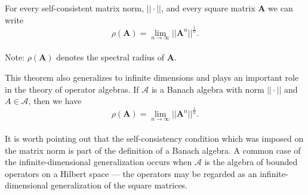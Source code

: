 \documentclass[12pt]{article}
\newcommand{\mv}[1]{\mathbf{#1}}
\begin{document}
For every self-consistent matrix norm, $||\cdot||$, and every square matrix $\mv{A}$ we can write\\
\begin{displaymath}
\rho(\mv{A})=\lim_{n \to \infty} ||\mv{A}^n||^{\frac{1}{n}}.
\end{displaymath}\\

Note: $\rho(\mv{A})$ denotes the spectral radius of $\mv{A}$.

This theorem also generalizes to infinite dimensions and plays an important role in the theory of operator algebras.  If $\mathcal{A}$ is a Banach algebra with norm $||\cdot||$ and $A \in \mathcal{A}$, then we have\\
\begin{displaymath}
\rho(\mv{A})=\lim_{n \to \infty} ||\mv{A}^n||^{\frac{1}{n}}.
\end{displaymath}\\

It is worth pointing out that the self-consistency condition which was imposed on the matrix norm is part of the definition of a Banach algebra.  A common case of the infinite-dimensional generalization  occurs when $\mathcal{A}$ is the algebra of bounded operators on a Hilbert space --- the operators may be regarded as an infinite-dimensional generalization of the square matrices.
\end{document}
